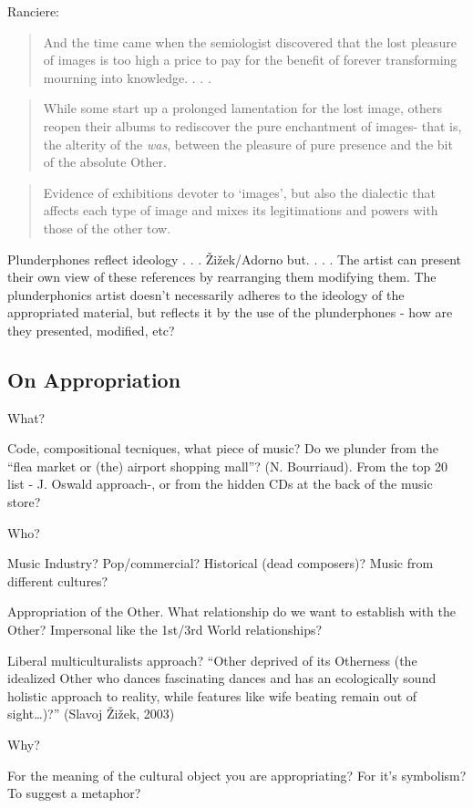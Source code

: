 Ranciere: 
\begin{quote}
And the time came when the semiologist discovered that the lost pleasure of images is too high a price to pay for the benefit of forever transforming mourning into knowledge. . . .
\end{quote}
\begin{quote}
While some start up a prolonged lamentation for the lost image, others reopen their albums to rediscover the pure enchantment of images- that is, the alterity of the \emph{was}, between the pleasure of pure presence and the bit of the absolute Other.
\end{quote}
\begin{quote}
Evidence of exhibitions devoter to `images', but also the dialectic that affects each type of image and mixes its legitimations and powers with those of the other tow.
\end{quote}
Plunderphones reflect ideology . . . \v{Z}i\v{z}ek/Adorno but. . . . The artist can present their own view of these references by rearranging them modifying them. The plunderphonics artist doesn't necessarily adheres to the ideology of the appropriated material, but reflects it by the use of the plunderphones - how are they presented, modified, etc?  

\subsection{On Appropriation}

What? 

Code, compositional tecniques, what piece of music? 
Do we plunder from the ``flea market or (the) airport shopping mall''? (N. Bourriaud). From the top 20 list - J. Oswald approach-, or from the hidden CDs at the back of the music store?

Who?

Music Industry? Pop/commercial? Historical (dead composers)? Music from different cultures? 

Appropriation of the Other. What relationship do we want to establish with the Other? Impersonal like the 1st/3rd World relationships?

Liberal multiculturalists approach? ``Other deprived of its Otherness (the idealized Other who dances fascinating dances and has an ecologically sound holistic approach to reality, while features like wife beating remain out of sight…)?'' (Slavoj \v{Z}i\v{z}ek, 2003)

Why?

For the meaning of the cultural object you are appropriating? For it’s symbolism? To suggest a metaphor?

